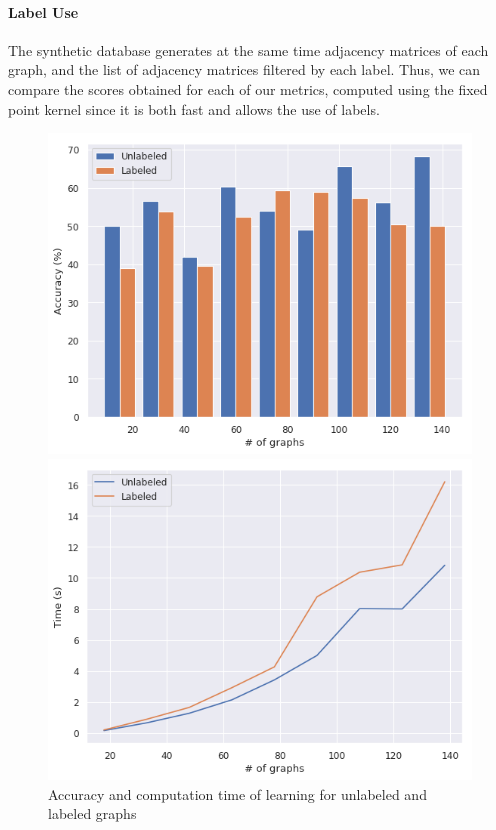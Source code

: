 \documentclass{article}
\theoremstyle{definition}
\begin{document}
\paragraph{Label Use}
The synthetic database generates at the same time adjacency matrices of each graph, and the list of adjacency matrices filtered by each label. Thus, we can compare the scores obtained for each of our metrics, computed using the fixed point kernel since it is both fast and allows the use of labels.
\begin{figure}[!htb]
	\begin{multicols}{2}
		\includegraphics[width=\linewidth]{data/lab_nolab/acc.png}\par
		\includegraphics[width=\linewidth]{data/lab_nolab/time.png}\par
	\end{multicols}
\caption {Accuracy and computation time of learning for unlabeled and labeled graphs}
\end{figure}
\end{document}
